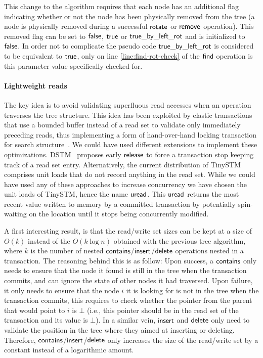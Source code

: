 This change to the algorithm requires that each node has an additional flag indicating whether or not the 
node has been physically removed from the tree (a node is physically removed during a successful $\act{rotate}$ or $\act{remove}$ operation).
This removed flag can be set to $\lit{false}$, $\lit{true}$ or $\lit{true\_by\_left\_rot}$ and is initialized to $\lit{false}$.
In order not to complicate the pseudo code $\lit{true\_by\_left\_rot}$ is considered to be equivalent to $\lit{true}$, only on line \ref{line:find-rot-check} of the $\act{find}$ operation is this
parameter value specifically checked for.

\paragraph{Lightweight reads}
The key idea is to avoid validating superfluous read accesses when an operation traverses the tree structure.
This idea has been exploited by elastic transactions that use a bounded buffer instead of a read set to 
validate only immediately preceding reads, thus implementing a form of hand-over-hand locking transaction for 
search structure~\cite{FGG09}. We could have used different extensions to implement these optimizations.
%
DSTM~\cite{HLMS03} proposes early $\act{release}$ to force a transaction stop keeping track of a read set entry.
Alternatively, the current distribution of TinySTM~\cite{FFR08} comprises 
unit loads that do not record anything in the read set. While we could have used any of these approaches 
to increase concurrency we have chosen the unit loads of TinySTM, hence the name $\act{uread}$.
This $\act{uread}$ returns the most recent value written to memory by a committed transaction by potentially spin-waiting on the location 
until it stops being concurrently modified.

A first interesting result, is that 
the read/write set sizes can be kept at a size of $O(k)$ instead of the $O(k\log{n})$ obtained with the previous tree algorithm, 
where $k$ is the number of nested $\act{contains}$/$\act{insert}$/$\act{delete}$ operations nested in a transaction.
The reasoning behind this is as follow:
Upon success, a $\act{contains}$ only needs to ensure that the node it found is still in the tree when the transaction commits,
and can ignore the state of other nodes it had traversed. Upon failure, it only needs to ensure that the node $i$ it is looking 
for is not in the tree when the transaction commits, this requires to check whether the pointer from the
parent that would point to $i$ is $\bot$ (i.e., this pointer should be in the read set of the transaction and its value is $\bot$).
In a similar vein, $\act{insert}$ and $\act{delete}$ only need to validate the position in the tree where they aimed at inserting or deleting.
Therefore, $\act{contains}$/$\act{insert}$/$\act{delete}$ only increases the size of the read/write set by a constant instead of a logarithmic 
amount.

